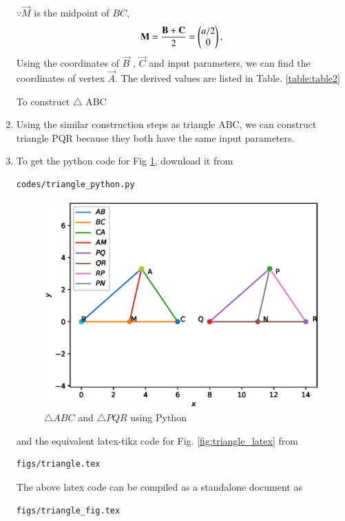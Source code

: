 \begin{enumerate}[label=\thesection.\arabic*.,ref=\thesection.\theenumi]
$\because \vec{M}$ is the midpoint of $BC$,
\begin{align}
\mathbf{M}= \frac{\mathbf{B}+\mathbf{C}}{2} =\begin{pmatrix}a/2\\0\end{pmatrix},
\label{eq:constr_m}
\end{align}
Using the coordinates of $\vec{B}$ , $\vec{C}$ and input parameters, we can find the coordinates of vertex $\vec{A}$. 
The derived values are listed in  
Table. \ref{table:table2} 
\begin{table}[ht!]
\centering

\caption{To construct $\triangle $ ABC}
\label{table:table2}
\end{table}
%
\item Using the similar construction steps as triangle ABC, we can construct triangle PQR because they both have the same input parameters.
%
\\
\item To get the python code for Fig \ref{fig:triangle_python}, download it from
\begin{lstlisting}
codes/triangle_python.py
\end{lstlisting}
\begin{figure}[!ht]
\centering
\includegraphics[width= \columnwidth]{Figure_1.eps}
\caption{$\triangle ABC$ and $\triangle PQR$ using Python}
\label{fig:triangle_python}
\end{figure}
%
and the equivalent latex-tikz code for Fig. \ref{fig:triangle_latex} from
\begin{lstlisting}
figs/triangle.tex
\end{lstlisting}
%
The above latex code can be compiled as a standalone document as
\begin{lstlisting}
figs/triangle_fig.tex
\end{lstlisting}



\end{enumerate}
